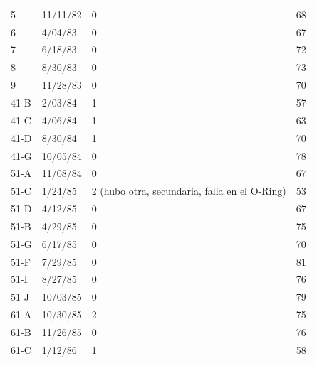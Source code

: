 \begin{landscape}
\begin{table}[h]
\begin{turn}{0}
\begin{tabular}{|l|l|l|l|}
5     & 11/11/82 & 0                                                               & 68                    \\
6     & 4/04/83  & 0                                                               & 67                    \\
7     & 6/18/83  & 0                                                               & 72                    \\
8     & 8/30/83  & 0                                                               & 73                    \\
9     & 11/28/83 & 0                                                               & 70                    \\
41-B  & 2/03/84  & 1                                                               & 57                    \\
41-C  & 4/06/84  & 1                                                               & 63                    \\
41-D  & 8/30/84  & 1                                                               & 70                    \\
41-G  & 10/05/84 & 0                                                               & 78                    \\
51-A  & 11/08/84 & 0                                                               & 67                    \\
51-C  & 1/24/85  & 2 (hubo otra, secundaria, falla en el O-Ring)                     & 53                    \\
51-D  & 4/12/85  & 0                                                               & 67                    \\
51-B  & 4/29/85  & 0                                                               & 75                    \\
51-G  & 6/17/85  & 0                                                               & 70                    \\
51-F  & 7/29/85  & 0                                                               & 81                    \\
51-I  & 8/27/85  & 0                                                               & 76                    \\
51-J  & 10/03/85 & 0                                                               & 79                    \\
61-A  & 10/30/85 & 2                                                               & 75                    \\
61-B  & 11/26/85 & 0                                                               & 76                    \\
61-C  & 1/12/86  & 1                                                               & 58                    \\
\hline
\end{tabular}
\end{turn}
\end{table}

\end{landscape} 


